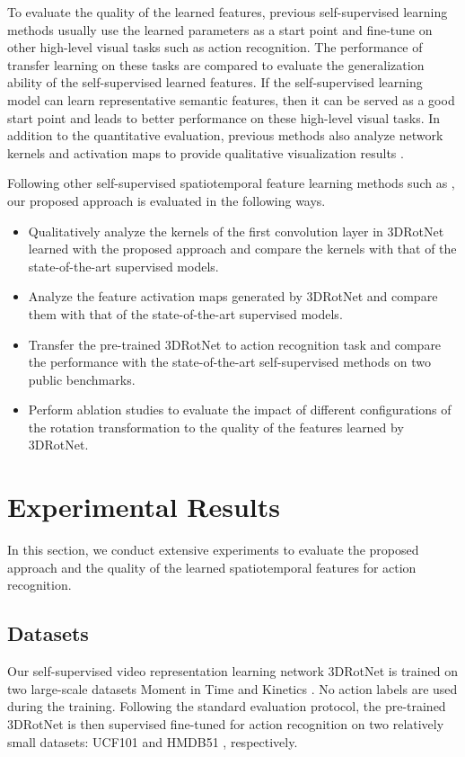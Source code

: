 \documentclass[10pt,twocolumn,letterpaper]{article}
\begin{document}
To evaluate the quality of the learned features, previous self-supervised learning methods usually use the learned parameters as a start point and fine-tune on other high-level visual tasks such as action recognition. The performance of transfer learning on these tasks are compared to evaluate the generalization ability of the self-supervised learned features. If the self-supervised learning model can learn representative semantic features, then it can be served as a good start point and leads to better performance on these high-level visual tasks. In addition to the quantitative evaluation, previous methods also analyze network kernels and activation maps to provide qualitative visualization results \cite{deepcluster, contextprediction, shuffleandlearn, SynGAN}.

Following other self-supervised spatiotemporal feature learning methods such as \cite{CubicPuzzles}, our proposed approach is evaluated in the following ways. 

\begin{itemize}[noitemsep,topsep=0pt]
	\item Qualitatively analyze the kernels of the first convolution layer in 3DRotNet learned with the proposed approach and compare the kernels with that of the state-of-the-art supervised models.
	\item Analyze the feature activation maps generated by 3DRotNet and compare them with that of the state-of-the-art supervised models.
	\item Transfer the pre-trained 3DRotNet to action recognition task and compare the performance with the state-of-the-art self-supervised methods on two public benchmarks.
	\item Perform ablation studies to evaluate the impact of different configurations of the rotation transformation to the quality of the features learned by 3DRotNet.
\end{itemize}








\section{Experimental Results}

In this section, we conduct extensive experiments to evaluate the proposed approach and the quality of the learned spatiotemporal features for action recognition.

\subsection{Datasets}
Our self-supervised video representation learning network 3DRotNet is trained on two large-scale datasets Moment in Time \cite{MITS} and Kinetics \cite{Kinetics}. No action labels are used during the training. Following the standard evaluation protocol, the pre-trained 3DRotNet is then supervised fine-tuned for action recognition on two relatively small datasets: UCF101 \cite{UCF101} and HMDB51 \cite{HMDB51}, respectively. 
\end{document}
